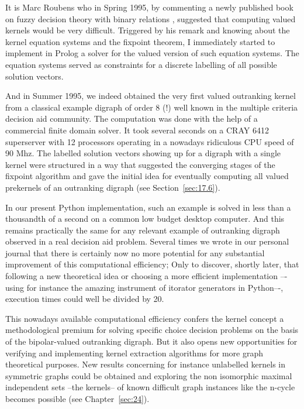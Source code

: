 It is Marc Roubens who in Spring 1995, by commenting a newly published book on fuzzy decision theory with binary relations \cite{KIT-1993}, suggested that computing valued kernels would be very difficult. Triggered by his remark and knowing about the \Berge kernel equation systems and the \Neumann fixpoint theorem, I immediately started to implement in Prolog a solver for the valued version of such equation systems. The \Berge equation systems served as constraints for a discrete labelling of all possible solution vectors.

And in Summer 1995, we indeed obtained the very first valued outranking kernel from a classical example digraph of order 8 (!) well known in the multiple criteria decision aid community. The computation was done with the help of a commercial finite domain solver. It took several seconds on a CRAY 6412 superserver with 12 processors operating in a nowadays ridiculous CPU speed of 90 Mhz. The labelled solution vectors showing up for a digraph with a single kernel were structured in a way that suggested the converging stages of the \Neumann fixpoint algorithm and gave the initial idea for eventually computing all valued prekernels of an outranking digraph (see Section~\ref{sec:17.6}). 

In our present Python implementation, such an example is solved in less than a thousandth of a second on a common low budget desktop computer. And this remains practically the same for any relevant example of outranking digraph observed in a real decision aid problem. Several times we wrote in our personal journal that there is certainly now no more potential for any substantial improvement of this computational efficiency; Only to discover, shortly later, that following a new theoretical idea or choosing a more efficient implementation –-using for instance the amazing instrument of itorator generators in Python–-, execution times could well be divided by 20.

This nowadays available computational efficiency confers the kernel concept a methodological premium for solving specific choice decision problems on the basis of the bipolar-valued outranking digraph. But it also opens new opportunities for verifying and implementing kernel extraction algorithms for more graph theoretical purposes. New results concerning for instance unlabelled kernels in symmetric graphs could be obtained and exploring the non isomorphic maximal independent sets --the kernels-- of known difficult graph instances like the n-cycle becomes possible (see Chapter~\ref{sec:24}).


\clearpage


%